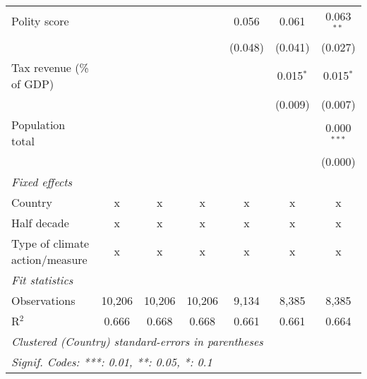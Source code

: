 \begin{tabular}{lcccccc}
   Polity score                                                            &         &                &                & 0.056          & 0.061          & 0.063$^{**}$\\   
                                                                           &         &                &                & (0.048)        & (0.041)        & (0.027)\\   
   Tax revenue (\% of GDP)                                                 &         &                &                &                & 0.015$^{*}$    & 0.015$^{*}$\\   
                                                                           &         &                &                &                & (0.009)        & (0.007)\\   
   Population total                                                        &         &                &                &                &                & 0.000$^{***}$\\   
                                                                           &         &                &                &                &                & (0.000)\\   
   \emph{Fixed effects}\\
   Country                                                                 & x       & x              & x              & x              & x              & x\\  
   Half decade                                                             & x       & x              & x              & x              & x              & x\\  
   Type of climate action/measure                                          & x       & x              & x              & x              & x              & x\\  
   \midrule \emph{Fit statistics}\\
   Observations                                                            & 10,206  & 10,206         & 10,206         & 9,134          & 8,385          & 8,385\\  
   R$^2$                                                                   & 0.666   & 0.668          & 0.668          & 0.661          & 0.661          & 0.664\\  
   \midrule
   \multicolumn{7}{l}{\emph{Clustered (Country) standard-errors in parentheses}}\\
   \multicolumn{7}{l}{\emph{Signif. Codes: ***: 0.01, **: 0.05, *: 0.1}}\\
\end{tabular}
\par\endgroup


